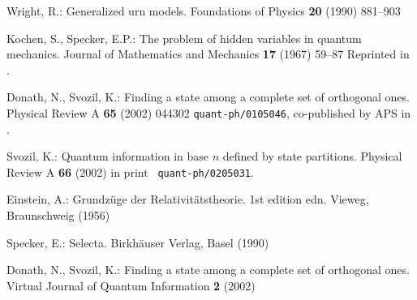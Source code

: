 \documentclass{llncs}
\begin{document}
\begin{thebibliography}{10}
Wright, R.:
\newblock Generalized urn models.
\newblock Foundations of Physics \textbf{20} (1990)  881--903

Kochen, S., Specker, E.P.:
\newblock The problem of hidden variables in quantum mechanics.
\newblock Journal of Mathematics and Mechanics \textbf{17} (1967)  59--87
  Reprinted in \cite[pp. 235--263]{specker-ges}.

Donath, N., Svozil, K.:
\newblock Finding a state among a complete set of orthogonal ones.
\newblock Physical Review A \textbf{65} (2002)  044302 {\tt quant-ph/0105046},
  co-published by APS in \cite{DonSvo01vjqi}.

Svozil, K.:
\newblock Quantum information in base $n$ defined by state partitions.
\newblock Physical Review A \textbf{66} (2002)  in print {\tt
  quant-ph/0205031}.

Einstein, A.:
\newblock Grundz{\"{u}}ge der {R}elativit{\"{a}}tstheorie. 1st edition edn.
\newblock Vieweg, Braunschweig (1956)

Specker, E.:
\newblock Selecta.
\newblock Birkh{\"{a}}user Verlag, Basel (1990)

Donath, N., Svozil, K.:
\newblock Finding a state among a complete set of orthogonal ones.
\newblock Virtual Journal of Quantum Information \textbf{2} (2002)

\end{thebibliography}
\end{document}
